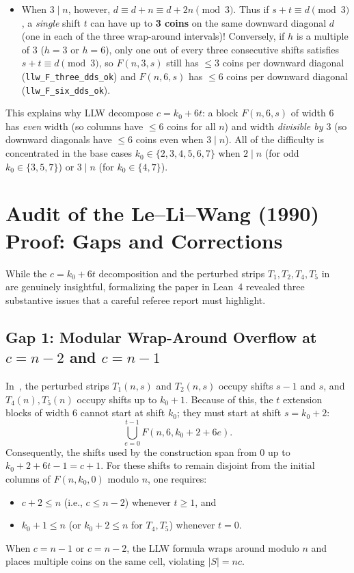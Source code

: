 \documentclass[11pt,a4paper]{article}
\theoremstyle{remark}
\begin{document}
\begin{itemize}
\begin{itemize}[nosep]
    \item When $3 \mid n$, however, $d \equiv d + n \equiv d + 2n \pmod 3$. Thus if $s + t \equiv d \pmod 3$, a \emph{single} shift $t$ can have up to \textbf{3 coins} on the same downward diagonal $d$ (one in each of the three wrap-around intervals)! Conversely, if $h$ is a multiple of $3$ ($h = 3$ or $h = 6$), only one out of every three consecutive shifts satisfies $s + t \equiv d \pmod 3$, so $F(n, 3, s)$ still has $\le 3$ coins per downward diagonal (\texttt{llw\_F\_three\_dds\_ok}) and $F(n, 6, s)$ has $\le 6$ coins per downward diagonal (\texttt{llw\_F\_six\_dds\_ok}).
  \end{itemize}
\end{itemize}

This explains why LLW decompose $c = k_0 + 6t$: a block $F(n, 6, s)$ of width $6$ has \emph{even} width (so columns have $\le 6$ coins for all $n$) and width \emph{divisible by $3$} (so downward diagonals have $\le 6$ coins even when $3 \mid n$). All of the difficulty is concentrated in the base cases $k_0 \in \{2, 3, 4, 5, 6, 7\}$ when $2 \mid n$ (for odd $k_0 \in \{3, 5, 7\}$) or $3 \mid n$ (for $k_0 \in \{4, 7\}$).

\section{Audit of the Le--Li--Wang (1990) Proof: Gaps and Corrections}

While the $c = k_0 + 6t$ decomposition and the perturbed strips $T_1, T_2, T_4, T_5$ in~\cite{LLW1990} are genuinely insightful, formalizing the paper in Lean~4 revealed three substantive issues that a careful referee report must highlight.

\subsection{Gap 1: Modular Wrap-Around Overflow at $c = n - 2$ and $c = n - 1$}

In~\cite{LLW1990}, the perturbed strips $T_1(n, s)$ and $T_2(n, s)$ occupy shifts $s-1$ and $s$, and $T_4(n), T_5(n)$ occupy shifts up to $k_0 + 1$. Because of this, the $t$ extension blocks of width $6$ cannot start at shift $k_0$; they must start at shift $s = k_0 + 2$:
\[
  \bigcup_{e = 0}^{t - 1} F(n, 6, k_0 + 2 + 6e).
\]
Consequently, the shifts used by the construction span from $0$ up to $k_0 + 2 + 6t - 1 = c + 1$. For these shifts to remain disjoint from the initial columns of $F(n, k_0, 0)$ modulo $n$, one requires:
\begin{itemize}[nosep]
  \item $c + 2 \le n$ (i.e., $c \le n - 2$) whenever $t \ge 1$, and
  \item $k_0 + 1 \le n$ (or $k_0 + 2 \le n$ for $T_4, T_5$) whenever $t = 0$.
\end{itemize}
When $c = n - 1$ or $c = n - 2$, the LLW formula wraps around modulo $n$ and places multiple coins on the same cell, violating $|S| = nc$.
\end{document}
